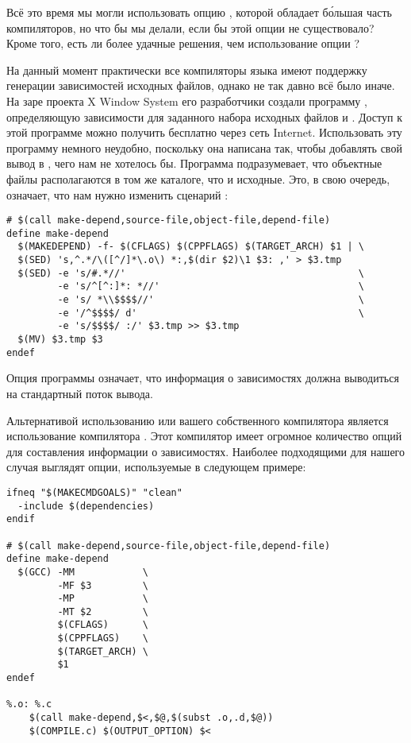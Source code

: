 Всё это время мы могли использовать опцию , которой
обладает б\'{о}льшая часть компиляторов, но что бы мы делали, если бы
этой опции не существовало? Кроме того, есть ли более удачные решения,
чем использование опции ?

На данный момент практически все компиляторы языка \Clang{} имеют
поддержку генерации зависимостей исходных файлов, однако не так давно
всё было иначе. На заре проекта X Window System его разработчики
создали программу , определяющую зависимости для
заданного набора исходных файлов \Clang{} и \Cplusplus{}. Доступ к
этой программе можно получить бесплатно через сеть Internet.
Использовать эту программу немного неудобно, поскольку она написана
так, чтобы добавлять свой вывод в \Makefile{}, чего нам не хотелось
бы. Программа  подразумевает, что объектные файлы
располагаются в том же каталоге, что и исходные. Это, в свою очередь,
означает, что нам нужно изменить сценарий :

{\footnotesize
\begin{verbatim}
# $(call make-depend,source-file,object-file,depend-file)
define make-depend
  $(MAKEDEPEND) -f- $(CFLAGS) $(CPPFLAGS) $(TARGET_ARCH) $1 | \
  $(SED) 's,^.*/\([^/]*\.o\) *:,$(dir $2)\1 $3: ,' > $3.tmp
  $(SED) -e 's/#.*//'                                         \
         -e 's/^[^:]*: *//'                                   \
         -e 's/ *\\$$$$//'                                    \
         -e '/^$$$$/ d'                                       \
         -e 's/$$$$/ :/' $3.tmp >> $3.tmp
  $(MV) $3.tmp $3
endef
\end{verbatim}
}

Опция  программы  означает, что
информация о зависимостях должна выводиться на стандартный поток
вывода.

Альтернативой использованию  или вашего
собственного компилятора является использование компилятора
\utility{gcc}. Этот компилятор имеет огромное количество опций для
составления информации о зависимостях. Наиболее подходящими для нашего
случая выглядят опции, используемые в следующем примере:

{\footnotesize
\begin{verbatim}
ifneq "$(MAKECMDGOALS)" "clean"
  -include $(dependencies)
endif

# $(call make-depend,source-file,object-file,depend-file)
define make-depend
  $(GCC) -MM            \
         -MF $3         \
         -MP            \
         -MT $2         \
         $(CFLAGS)      \
         $(CPPFLAGS)    \
         $(TARGET_ARCH) \
         $1
endef

%.o: %.c
    $(call make-depend,$<,$@,$(subst .o,.d,$@))
    $(COMPILE.c) $(OUTPUT_OPTION) $<
\end{verbatim}
}

